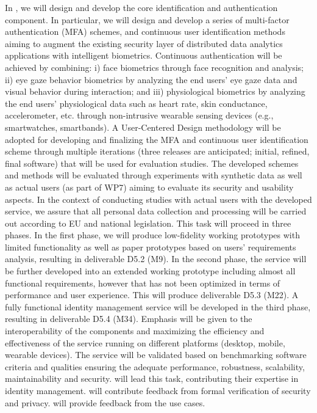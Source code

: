 \begin{Workpackage}{\thewpno}
\begin{Task}
In \theTask, we will design and develop the core identification and authentication component. In particular, we will design and develop a series of multi-factor authentication (MFA) schemes, and continuous user identification methods aiming to augment the existing security layer of distributed data analytics applications with intelligent biometrics. Continuous authentication will be achieved by combining: i) face biometrics through face recognition and analysis; ii) eye gaze behavior biometrics by analyzing the end users' eye gaze data and visual behavior during interaction; and iii) physiological biometrics by analyzing the end users' physiological data such as heart rate, skin conductance, accelerometer, etc. through non-intrusive wearable sensing devices (e.g., smartwatches, smartbands). A User-Centered Design methodology will be adopted for developing and finalizing the MFA and continuous user identification scheme through multiple iterations (three releases are anticipated; initial, refined, final software) that will be used for evaluation studies. The developed schemes and methods will be evaluated through experiments with synthetic data as well as actual users (as part of WP7) aiming to evaluate its security and usability aspects. In the context of conducting studies with actual users with the developed service, we assure that all personal data collection and processing will be carried out according to EU and national legislation. This task will proceed in three phases. In the first phase, we will produce low-fidelity working prototypes with limited functionality as well as paper prototypes based on users’ requirements analysis, resulting in deliverable D5.2 (M9). In the second phase, the service will be further developed into an extended working prototype including almost all functional requirements, however that has not been optimized in terms of performance and user experience. This will produce deliverable D5.3 (M22). A fully functional identity management service will be developed in the third phase, resulting in deliverable D5.4 (M34). Emphasis will be given to the interoperability of the components and maximizing the efficiency and effectiveness of the service running on different platforms (desktop, mobile, wearable devices). The service will be validated based on benchmarking software criteria and qualities ensuring the adequate performance, robustness, scalability, maintainability and security. \COGNIshort{} will lead this task, contributing their expertise in identity management. \USTANshort{} will contribute feedback from formal verification of security and privacy. \SOPRAshort{} will provide feedback from the use cases.
\end{Task}


\end{Workpackage}
